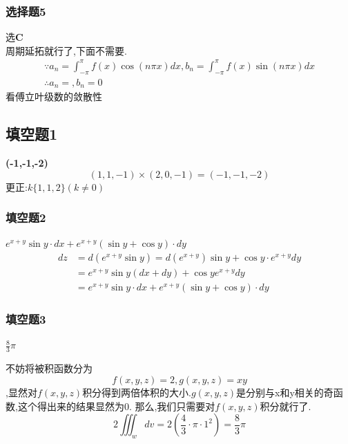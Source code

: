 \documentclass[a4paper,12pt]{ctexrep}
\begin{document}
\subsubsection{选择题5}
选\textbf{C} \\
周期延拓就行了,下面不需要.
\begin{equation*}
\begin{aligned}
\because a_{n}=\int_{-\pi}^{\pi}f(x)\cos(n\pi x)dx,b_{n}=\int_{-\pi}^{\pi}f(x)\sin(n\pi x)dx \\
\therefore 
a_{n}=,
b_{n}=0
\end{aligned}
\end{equation*}
看傅立叶级数的敛散性

\newpage

\subsection{填空题1}
\textbf{(-1,-1,-2)}
\begin{equation*}
(1,1,-1)\times(2,0,-1) =(-1,-1,-2)
\end{equation*}
更正:$k\{1,1,2\}(k\neq0)$

\subsubsection{填空题2}
\textbf{$e^{x+y}\sin y \cdot dx + e^{x+y} (\sin y + \cos y ) \cdot dy$}
\begin{equation*}
\begin{aligned}dz&=d(e^{x+y}\sin y)=d(e^{x+y})\sin y+\cos y\cdot e^{x+y}dy\\&
=e^{x+y}\sin y(dx+dy)+\cos ye^{x+y}dy\\&
=e^{x+y}\sin y \cdot dx + e^{x+y} (\sin y + \cos y ) \cdot dy
\end{aligned}
\end{equation*}

\subsubsection{填空题3}
\textbf{$\frac{8}{3}\pi$}

不妨将被积函数分为$$f(x,y,z)=2,g(x,y,z)=xy$$,显然对$f(x,y,z)$积分得到两倍体积的大小.$g(x,y,z)$是分别与x和y相关的奇函数,这个得出来的结果显然为0.
那么,我们只需要对$f(x,y,z)$积分就行了.
\begin{equation*}{2\iiint_{w}dv=2(\frac{4}{3}\cdot\pi\cdot 1^{2})=\frac{8}{3}\pi }\end{equation*}
\end{document}
